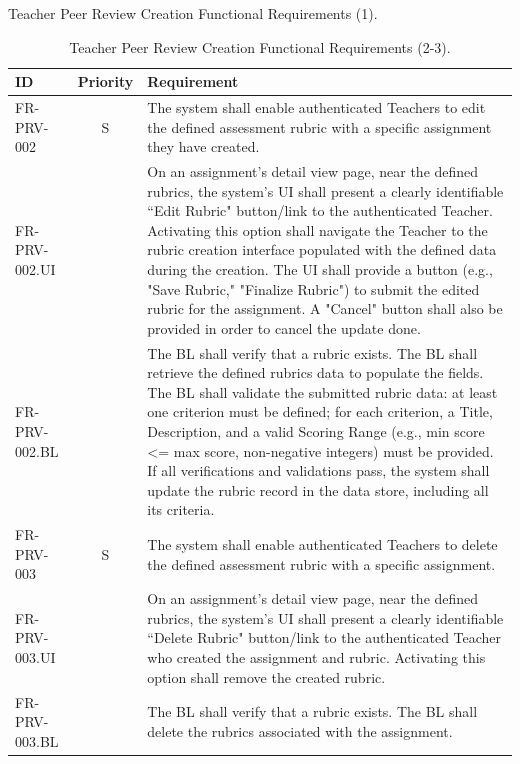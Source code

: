 \begin{table}[h]
    \centering
    \caption{Teacher Peer Review Creation Functional Requirements (1).}
    \label{tab:TeacherPeerReviewFR1}
\end{table}
\vspace*{\fill}
\clearpage
\vspace*{\fill}
\begin{table}[h]
    \centering
    \begin{tabular}{|l|c|p{10cm}|}
        \hline
        \textbf{ID} & \textbf{Priority} & \textbf{Requirement} \\
        \hline
        FR-PRV-002 & S & The system shall enable authenticated Teachers to edit the defined assessment rubric with a specific assignment they have created. \\
        \quad FR-PRV-002.UI &  & \quad On an assignment's detail view page, near the defined rubrics, the system's UI shall present a clearly identifiable “Edit Rubric" button/link to the authenticated Teacher. Activating this option shall navigate the Teacher to the rubric creation interface populated with the defined data during the creation. The UI shall provide a button (e.g., "Save Rubric," "Finalize Rubric") to submit the edited rubric for the assignment. A "Cancel" button shall also be provided in order to cancel the update done. \\
        \quad FR-PRV-002.BL &  & \quad The BL shall verify that a rubric exists. The BL shall retrieve the defined rubrics data to populate the fields. The BL shall validate the submitted rubric data: at least one criterion must be defined; for each criterion, a Title, Description, and a valid Scoring Range (e.g., min score <= max score, non-negative integers) must be provided. If all verifications and validations pass, the system shall update the rubric record in the data store, including all its criteria. \\
        \hline
        FR-PRV-003 & S & The system shall enable authenticated Teachers to delete the defined assessment rubric with a specific assignment. \\
        \quad FR-PRV-003.UI &  & \quad On an assignment's detail view page, near the defined rubrics, the system's UI shall present a clearly identifiable “Delete Rubric" button/link to the authenticated Teacher who created the assignment and rubric. Activating this option shall remove the created rubric. \\
        \quad FR-PRV-003.BL &  & \quad The BL shall verify that a rubric exists. The BL shall delete the rubrics associated with the assignment. \\
        \hline
    \end{tabular}
    \caption{Teacher Peer Review Creation Functional Requirements (2-3).}
    \label{tab:TeacherPeerReviewFR2}
\end{table}
\vspace*{\fill}

